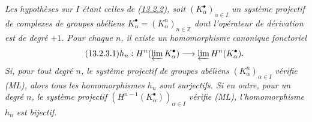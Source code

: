 \begin{proposition}[13.2.3]
\label{0.13.2.3-fr}
\emph{Les hypothèses sur $I$ étant celles de
(\hyperref[0.13.2.2-fr]{13.2.2}), soit
$(K_\alpha^\bullet)_{\alpha\in I}$ un système projectif de complexes de
groupes abéliens
$K_\alpha^\bullet=(K_\alpha^n)_{n\in\mathbb Z}$ dont l'opérateur de
dérivation est de degré $+1$. Pour chaque $n$, il existe un homomorphisme
canonique fonctoriel}
\begin{equation}
\label{0.13.2.3.1-fr}
\tag{13.2.3.1}
h_n:H^n(\varprojlim K_\alpha^\bullet)
\longrightarrow\varprojlim H^n(K_\alpha^\bullet).
\end{equation}
\emph{Si, pour tout degré $n$, le système projectif de groupes abéliens
$(K_\alpha^n)_{\alpha\in I}$ vérifie (ML), alors tous les homomorphismes
$h_n$ sont surjectifs. Si en outre, pour un degré $n$, le système
projectif $(H^{n-1}(K_\alpha^\bullet))_{\alpha\in I}$ vérifie (ML),
l'homomorphisme $h_n$ est bijectif.}
\end{proposition}

